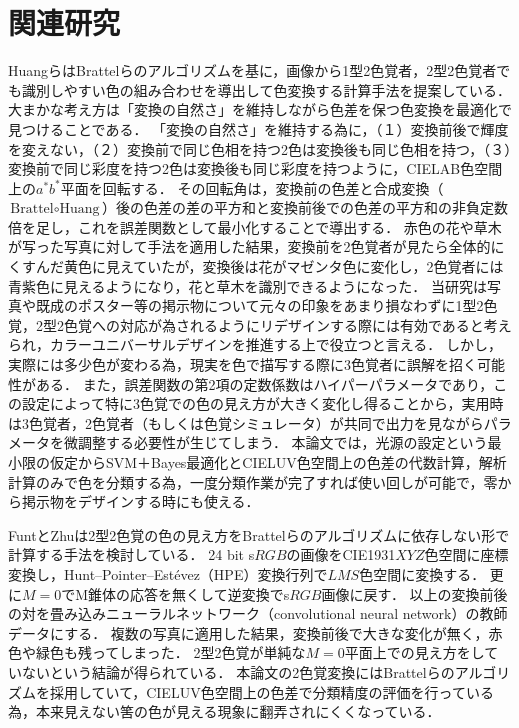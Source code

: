 \documentclass[uplatex,paper=a4,fontsize=4.0truemm,jafontsize=4.0truemm,head_space=30.0truemm,foot_space=30.0truemm,baselineskip=8.0truemm,line_length=40zw,gutter=25.0truemm,oneside,openany,fleqn,hanging_panctuation,open_bracket_pos=nibu_tentsuki,dvipdfmx,jis2004,book,titlepage]{jlreq}
\theoremstyle{mystyle}
\newcommand{\mathdisplaystyle}[1]{\(\displaystyle{#1}\)}
\begin{document}
	\chapter{関連研究}
		HuangらはBrattelらのアルゴリズムを基に，画像から1型2色覚者，2型2色覚者でも識別しやすい色の組み合わせを導出して色変換する計算手法を提案している\cite{Huang2007}．
		大まかな考え方は「変換の自然さ」を維持しながら色差を保つ色変換を最適化で見つけることである．
		「変換の自然さ」を維持する為に，（１）変換前後で輝度を変えない，（２）変換前で同じ色相を持つ2色は変換後も同じ色相を持つ，（３）変換前で同じ彩度を持つ2色は変換後も同じ彩度を持つように，CIELAB色空間上の\mathdisplaystyle{a^\ast b^\ast}平面を回転する．
		その回転角は，変換前の色差と合成変換（\mathdisplaystyle{\textrm{Brattel}\circ\textrm{Huang}}）後の色差の差の平方和と変換前後での色差の平方和の非負定数倍を足し，これを誤差関数として最小化することで導出する．
		赤色の花や草木が写った写真に対して手法を適用した結果，変換前を2色覚者が見たら全体的にくすんだ黄色に見えていたが，変換後は花がマゼンタ色に変化し，2色覚者には青紫色に見えるようになり，花と草木を識別できるようになった．
		当研究は写真や既成のポスター等の掲示物について元々の印象をあまり損なわずに1型2色覚，2型2色覚への対応が為されるようにリデザインする際には有効であると考えられ，カラーユニバーサルデザインを推進する上で役立つと言える．
		しかし，実際には多少色が変わる為，現実を色で描写する際に3色覚者に誤解を招く可能性がある．
		また，誤差関数の第2項の定数係数はハイパーパラメータであり，この設定によって特に3色覚での色の見え方が大きく変化し得ることから，実用時は3色覚者，2色覚者（もしくは色覚シミュレータ）が共同で出力を見ながらパラメータを微調整する必要性が生じてしまう．
		本論文では，光源の設定という最小限の仮定からSVM＋Bayes最適化とCIELUV色空間上の色差の代数計算，解析計算のみで色を分類する為，一度分類作業が完了すれば使い回しが可能で，零から掲示物をデザインする時にも使える．

		FuntとZhuは2型2色覚の色の見え方をBrattelらのアルゴリズムに依存しない形で計算する手法を検討している\cite{Funt2018}．
		24 bit s\mathdisplaystyle{RGB}の画像をCIE1931\mathdisplaystyle{XYZ}色空間に座標変換し，Hunt--Pointer--Estévez（HPE）変換行列で\mathdisplaystyle{LMS}色空間に変換する．
		更に\mathdisplaystyle{M=0}でM錐体の応答を無くして逆変換でs\mathdisplaystyle{RGB}画像に戻す．
		以上の変換前後の対を畳み込みニューラルネットワーク（convolutional neural network）の教師データにする．
		複数の写真に適用した結果，変換前後で大きな変化が無く，赤色や緑色も残ってしまった．
		2型2色覚が単純な\mathdisplaystyle{M=0}平面上での見え方をしていないという結論が得られている．
		本論文の2色覚変換にはBrattelらのアルゴリズムを採用していて，CIELUV色空間上の色差で分類精度の評価を行っている為，本来見えない筈の色が見える現象に翻弄されにくくなっている．
\end{document}
